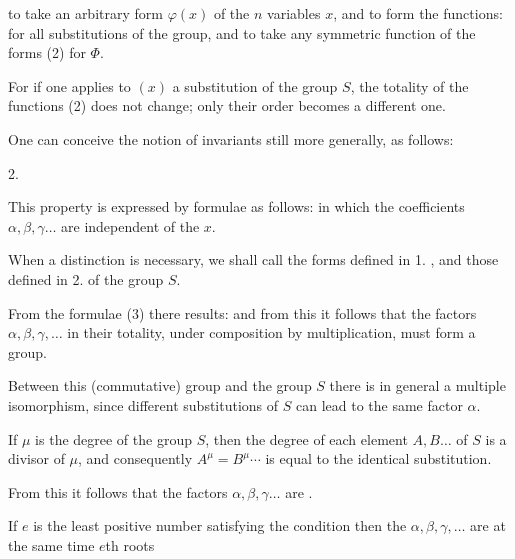 to take an arbitrary form $\varphi(x)$ of the $n$ variables $x$,
and to form the functions:
for all substitutions of the group, and to take any
symmetric function of the forms (2) for $\Phi$.

For if one applies to $(x)$ a substitution of the group $S$,
the totality of the functions (2) does not change; only
their order becomes a different one.

One can conceive the notion of invariants still more generally,
as follows:

2. 

This property is expressed by formulae as follows:
in which the coefficients $\alpha,\beta,\gamma\ldots$ are independent of the $x$.

When a distinction is necessary, we shall call the forms
defined in 1. , and those defined in 2.  of the group $S$.

From the formulae (3) there results:
and from this it follows that the factors $\alpha,\beta,\gamma,\ldots$ in their totality,
under composition by multiplication, must form a
group.

Between this (commutative) group and the group $S$
there is in general a multiple isomorphism, since
different substitutions of $S$ can lead to the same factor $\alpha$.

If $\mu$ is the degree of the group $S$, then the degree of each
element $A, B \ldots$ of $S$ is a divisor of $\mu$, and consequently
$A^\mu = B^\mu \cdots$ is equal to the identical substitution.

From this it follows that the factors $\alpha,\beta,\gamma\ldots$ are .

If $e$ is the least positive number satisfying the condition
then the $\alpha, \beta, \gamma, \ldots$ are at the same time $e$th roots
